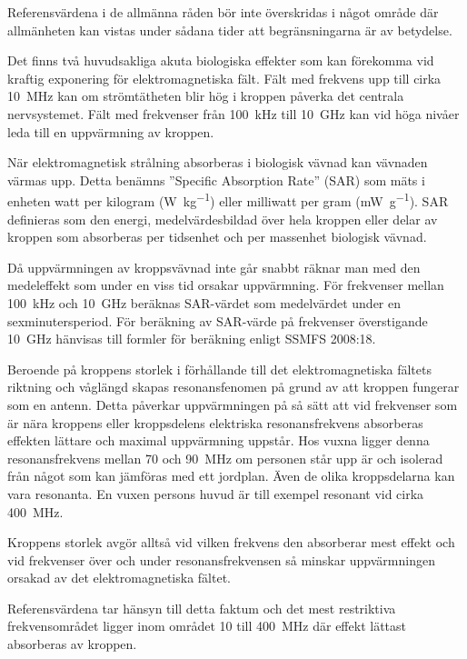 Referensvärdena i de allmänna råden bör inte överskridas i något område där
allmänheten kan vistas under sådana tider att begränsningarna är av betydelse.

Det finns två huvudsakliga akuta biologiska effekter som kan förekomma vid
kraftig exponering för elektromagnetiska fält.
Fält med frekvens upp till cirka \qty{10}{\mega\hertz} kan om strömtätheten blir
hög i kroppen påverka det centrala nervsystemet.
Fält med frekvenser från \qty{100}{\kilo\hertz} till \qty{10}{\giga\hertz} kan
vid höga nivåer leda till en uppvärmning av kroppen.

När elektromagnetisk strålning absorberas i biologisk vävnad kan vävnaden värmas
upp.
Detta benämns ''Specific Absorption Rate'' (SAR) som mäts i enheten watt per
kilogram (\unit{\watt\per\kilo\gram}) eller milliwatt per gram
(\unit{\milli\watt\per\gram}).
SAR definieras som den energi, medelvärdesbildad över hela kroppen eller delar
av kroppen som absorberas per tidsenhet och per massenhet biologisk vävnad.

Då uppvärmningen av kroppsvävnad inte går snabbt räknar man med den medeleffekt
som under en viss tid orsakar uppvärmning.
För frekvenser mellan \qty{100}{\kilo\hertz} och \qty{10}{\giga\hertz} beräknas
SAR-värdet som medelvärdet under en sexminutersperiod.
För beräkning av SAR-värde på frekvenser överstigande \qty{10}{\giga\hertz}
hänvisas till formler för beräkning enligt SSMFS 2008:18.

Beroende på kroppens storlek i förhållande till det elektromagnetiska fältets
riktning och våglängd skapas resonansfenomen på grund av att kroppen fungerar
som en antenn.
Detta påverkar uppvärmningen på så sätt att vid frekvenser som är nära kroppens
eller kroppsdelens elektriska resonansfrekvens absorberas effekten lättare och
maximal uppvärmning uppstår.
Hos vuxna ligger denna resonansfrekvens mellan 70 och \qty{90}{\mega\hertz} om
personen står upp är och isolerad från något som kan jämföras med ett jordplan.
Även de olika kroppsdelarna kan vara resonanta.
En vuxen persons huvud är till exempel resonant vid cirka \qty{400}{\mega\hertz}.

Kroppens storlek avgör alltså vid vilken frekvens den absorberar mest effekt och
vid frekvenser över och under resonansfrekvensen så minskar uppvärmningen
orsakad av det elektromagnetiska fältet.

Referensvärdena tar hänsyn till detta faktum och det mest restriktiva
frekvensområdet ligger inom området 10 till \qty{400}{\mega\hertz} där effekt
lättast absorberas av kroppen.

